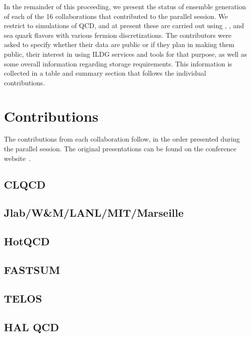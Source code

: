 \documentclass[a4paper,11pt]{article}
\begin{document}
In the remainder of this proceeding, we present the status of ensemble
generation of each of the 16 collaborations that contributed to the
parallel session. We restrict to simulations of QCD, and at present
these are carried out using , , and
 sea quark flavors with various fermion
discretizations. The contributors were asked to specify whether their
data are public or if they plan in making them public, their interest
in using ILDG services and tools for that purpose, as well as some
overall information regarding storage requirements. This information
is collected in a table and summary section that follows the
individual contributions.

\section{Contributions}
The contributions from each collaboration follow, in the order
presented during the parallel session. The original presentations can
be found on the conference website~\cite{parallel-session}.

\newpage
\subsection{CLQCD}

\subsection{Jlab/W\&M/LANL/MIT/Marseille}

\subsection{HotQCD}

\subsection{FASTSUM}

\subsection{TELOS}

\subsection{HAL QCD}
\end{document}
